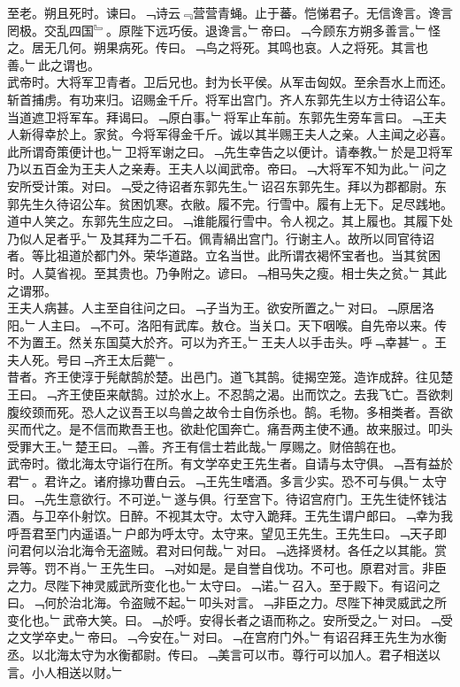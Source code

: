 \documentclass{zhvt-classic}
\begin{document}
\hspace*{2em}至老。朔且死时。谏曰。﹁诗云﹃营营青蝇。止于蕃。恺悌君子。无信谗言。谗言罔极。交乱四国﹄。原陛下远巧佞。退谗言。﹂帝曰。﹁今顾东方朔多善言。﹂怪之。居无几何。朔果病死。传曰。﹁鸟之将死。其鸣也哀。人之将死。其言也善。﹂此之谓也。\\
\hspace*{2em}武帝时。大将军卫青者。卫后兄也。封为长平侯。从军击匈奴。至余吾水上而还。斩首捕虏。有功来归。诏赐金千斤。将军出宫门。齐人东郭先生以方士待诏公车。当道遮卫将军车。拜谒曰。﹁原白事。﹂将军止车前。东郭先生旁车言曰。﹁王夫人新得幸於上。家贫。今将军得金千斤。诚以其半赐王夫人之亲。人主闻之必喜。此所谓奇策便计也。﹂卫将军谢之曰。﹁先生幸告之以便计。请奉教。﹂於是卫将军乃以五百金为王夫人之亲寿。王夫人以闻武帝。帝曰。﹁大将军不知为此。﹂问之安所受计策。对曰。﹁受之待诏者东郭先生。﹂诏召东郭先生。拜以为郡都尉。东郭先生久待诏公车。贫困饥寒。衣敝。履不完。行雪中。履有上无下。足尽践地。道中人笑之。东郭先生应之曰。﹁谁能履行雪中。令人视之。其上履也。其履下处乃似人足者乎。﹂及其拜为二千石。佩青緺出宫门。行谢主人。故所以同官待诏者。等比祖道於都门外。荣华道路。立名当世。此所谓衣褐怀宝者也。当其贫困时。人莫省视。至其贵也。乃争附之。谚曰。﹁相马失之瘦。相士失之贫。﹂其此之谓邪。\\
\hspace*{2em}王夫人病甚。人主至自往问之曰。﹁子当为王。欲安所置之。﹂对曰。﹁原居洛阳。﹂人主曰。﹁不可。洛阳有武库。敖仓。当关口。天下咽喉。自先帝以来。传不为置王。然关东国莫大於齐。可以为齐王。﹂王夫人以手击头。呼﹁幸甚﹂。王夫人死。号曰﹁齐王太后薨﹂。\\
\hspace*{2em}昔者。齐王使淳于髡献鹄於楚。出邑门。道飞其鹄。徒揭空笼。造诈成辞。往见楚王曰。﹁齐王使臣来献鹄。过於水上。不忍鹄之渴。出而饮之。去我飞亡。吾欲刺腹绞颈而死。恐人之议吾王以鸟兽之故令士自伤杀也。鹄。毛物。多相类者。吾欲买而代之。是不信而欺吾王也。欲赴佗国奔亡。痛吾两主使不通。故来服过。叩头受罪大王。﹂楚王曰。﹁善。齐王有信士若此哉。﹂厚赐之。财倍鹄在也。\\
\hspace*{2em}武帝时。徵北海太守诣行在所。有文学卒史王先生者。自请与太守俱。﹁吾有益於君﹂。君许之。诸府掾功曹白云。﹁王先生嗜酒。多言少实。恐不可与俱。﹂太守曰。﹁先生意欲行。不可逆。﹂遂与俱。行至宫下。待诏宫府门。王先生徒怀钱沽酒。与卫卒仆射饮。日醉。不视其太守。太守入跪拜。王先生谓户郎曰。﹁幸为我呼吾君至门内遥语。﹂户郎为呼太守。太守来。望见王先生。王先生曰。﹁天子即问君何以治北海令无盗贼。君对曰何哉。﹂对曰。﹁选择贤材。各任之以其能。赏异等。罚不肖。﹂王先生曰。﹁对如是。是自誉自伐功。不可也。原君对言。非臣之力。尽陛下神灵威武所变化也。﹂太守曰。﹁诺。﹂召入。至于殿下。有诏问之曰。﹁何於治北海。令盗贼不起。﹂叩头对言。﹁非臣之力。尽陛下神灵威武之所变化也。﹂武帝大笑。曰。﹁於呼。安得长者之语而称之。安所受之。﹂对曰。﹁受之文学卒史。﹂帝曰。﹁今安在。﹂对曰。﹁在宫府门外。﹂有诏召拜王先生为水衡丞。以北海太守为水衡都尉。传曰。﹁美言可以市。尊行可以加人。君子相送以言。小人相送以财。﹂\\
\end{document}

